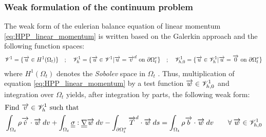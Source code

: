 \subsubsection*{Weak formulation of the continuum problem}
The weak form of the eulerian balance equation of linear momentum \eqref{eq:HPP_linear_momentum} is written based on the Galerkin approach and the following function spaces:
\begin{equation}
\mathscr{V}^1 = \{ {\overrightarrow{u}} \in H^1(\Omega_t) \}  \quad ; \quad \mathscr{V}^1_{h} = \{{\overrightarrow{u}} \in \mathscr{V}^1 | {\overrightarrow{u}}={\overrightarrow{v}}^d \text{ on } \partial \Omega_t^v \}  \quad ; \quad \mathscr{V}^1_{h,0} = \{{\overrightarrow{u}} \in \mathscr{V}_h^1 | {\overrightarrow{u}}={\overrightarrow{0}} \text{ on } \partial \Omega_t^v \} 
\end{equation}
where $H^1(\Omega_t)$ denotes the \textit{Sobolev} space in $\Omega_t$ \cite{DiPietro}. Thus, multiplication of equation \eqref{eq:HPP_linear_momentum} by a test function ${\overrightarrow{w}} \in \mathscr{V}^1_{h,0}$ and integration over $\Omega_t$ yields, after integration by parts, the following weak form:
\begin{equation}
  \label{eq:linear_momentum_weak_form}
  \begin{aligned}
    &\text{Find ${\overrightarrow{v}}\in \mathscr{V}_h^1$ such that} \\
    &\int_{\Omega_t}  \rho  {\overrightarrow{\dot{v}}} \cdot {\overrightarrow{w}}\: dv + \int_{\Omega_t}{\underline{\underline{\sigma}}}: 
    {\underline{\underline{\nabla}}} {\overrightarrow{w}} \:dv - \int_{\partial \Omega^\sigma_t} {\overrightarrow{T}}^d\cdot{\overrightarrow{w}}\: ds= \int_{\Omega_t} \rho {\overrightarrow{b}}\cdot {\overrightarrow{w}} \: dv  \qquad \forall \: {\overrightarrow{w}} \in \mathscr{V}_{h,0}^1
  \end{aligned}
\end{equation}

